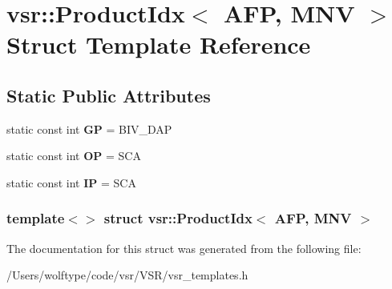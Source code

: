 \hypertarget{structvsr_1_1_product_idx_3_01_a_f_p_00_01_m_n_v_01_4}{\section{vsr\-:\-:Product\-Idx$<$ A\-F\-P, M\-N\-V $>$ Struct Template Reference}
\label{structvsr_1_1_product_idx_3_01_a_f_p_00_01_m_n_v_01_4}
}
\subsection*{Static Public Attributes}
\begin{DoxyCompactItemize}
\item 
\hypertarget{structvsr_1_1_product_idx_3_01_a_f_p_00_01_m_n_v_01_4_a6afbca25aa66d668fc108f8decdf47f5}{static const int {\bfseries G\-P} = B\-I\-V\-\_\-\-D\-A\-P}\label{structvsr_1_1_product_idx_3_01_a_f_p_00_01_m_n_v_01_4_a6afbca25aa66d668fc108f8decdf47f5}

\item 
\hypertarget{structvsr_1_1_product_idx_3_01_a_f_p_00_01_m_n_v_01_4_a266eca3e51dc44640e3076ad4eaae167}{static const int {\bfseries O\-P} = S\-C\-A}\label{structvsr_1_1_product_idx_3_01_a_f_p_00_01_m_n_v_01_4_a266eca3e51dc44640e3076ad4eaae167}

\item 
\hypertarget{structvsr_1_1_product_idx_3_01_a_f_p_00_01_m_n_v_01_4_a5457b4d1695e9f49fbbc93ae643e055c}{static const int {\bfseries I\-P} = S\-C\-A}\label{structvsr_1_1_product_idx_3_01_a_f_p_00_01_m_n_v_01_4_a5457b4d1695e9f49fbbc93ae643e055c}

\end{DoxyCompactItemize}
\subsubsection*{template$<$$>$ struct vsr\-::\-Product\-Idx$<$ A\-F\-P, M\-N\-V $>$}



The documentation for this struct was generated from the following file\-:\begin{DoxyCompactItemize}
\item 
/\-Users/wolftype/code/vsr/\-V\-S\-R/vsr\-\_\-templates.\-h\end{DoxyCompactItemize}
